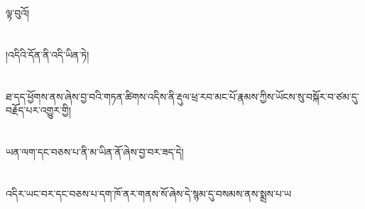 ལྟ་བུའོ།\chapter{ }།འདིའི་དོན་ནི་འདི་ཡིན་ཏེ།\chapter{ }ཐ་དད་ཕྱོགས་ནས་ཞེས་བྱ་བའི་གཏན་ཚིགས་འདིས་ནི་རྡུལ་ཕྲ་རབ་མང་པོ་རྣམས་ཀྱིས་ཡོངས་སུ་བསྐོར་བ་ཙམ་དུ་བརྗོད་པར་འགྱུར་གྱི།\chapter{ }ཡན་ལག་དང་བཅས་པ་ནི་མ་ཡིན་ནོ་ཞེས་བྱ་བར་ཟད་དེ།\chapter{ }འདིར་ཡང་བར་དང་བཅས་པ་དག་ཁོ་ནར་གནས་སོ་ཞེས་དེ་སྙམ་དུ་བསམས་ནས་སྨྲས་པ་ཡ